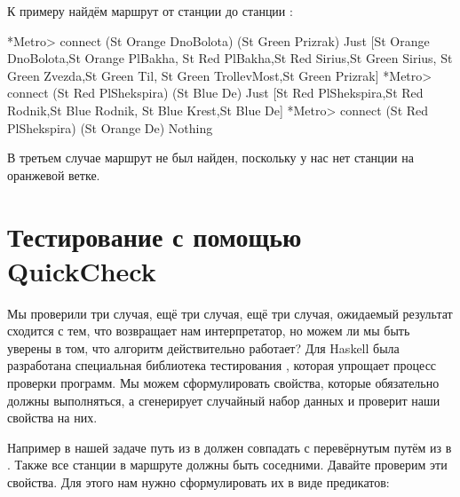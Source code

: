К примеру найдём маршрут от станции  до 
станции :

\begin{code}
*Metro> connect (St Orange DnoBolota) (St Green Prizrak)
Just [St Orange DnoBolota,St Orange PlBakha,
    St Red PlBakha,St Red Sirius,St Green Sirius,
    St Green Zvezda,St Green Til,
    St Green TrollevMost,St Green Prizrak]
*Metro> connect (St Red PlShekspira) (St Blue De)
Just [St Red PlShekspira,St Red Rodnik,St Blue Rodnik,
    St Blue Krest,St Blue De]
*Metro> connect (St Red PlShekspira) (St Orange De)
Nothing
\end{code}

В третьем случае маршрут не был найден, поскольку у нас 
нет станции  на оранжевой ветке.

\section{Тестирование с помощью QuickCheck}

Мы проверили три случая, ещё три случая, ещё три случая,
ожидаемый результат сходится с тем, что возвращает
нам интерпретатор, но можем ли мы быть уверены в том, что
алгоритм действительно работает? Для Haskell была
разработана специальная библиотека тестирования ,
которая упрощает процесс проверки программ. 
Мы можем сформулировать свойства, которые обязательно
должны выполняться, а  сгенерирует
случайный набор данных и проверит наши свойства на них.

Например в нашей задаче путь из  в 
должен совпадать с перевёрнутым путём из  в .
Также все станции в маршруте должны быть соседними.
Давайте проверим эти свойства. Для этого нам нужно
сформулировать их в виде предикатов:


